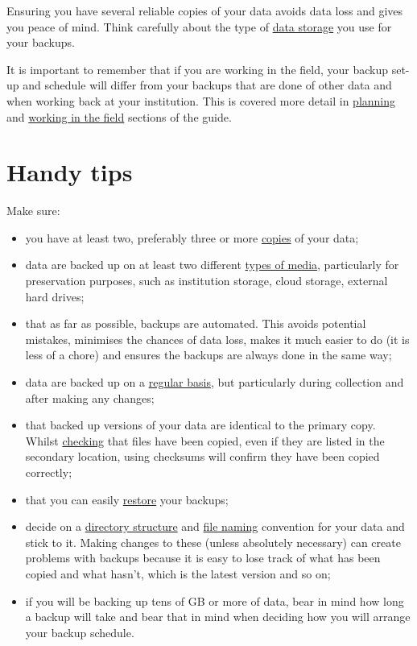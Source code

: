 \documentclass[a4paper,oneside]{report}
\providecommand{\tightlist}{%
  \setlength{\itemsep}{0pt}\setlength{\parskip}{0pt}}
\begin{document}
Ensuring you have several reliable copies of your data avoids data loss
and gives you peace of mind. Think carefully about the type of
\protect\hyperlink{storing-data}{data storage} you use for your backups.

It is important to remember that if you are working in the field, your
backup set-up and schedule will differ from your backups that are done
of other data and when working back at your institution. This is covered
more detail in \protect\hyperlink{before-you-go}{planning} and
\protect\hyperlink{in-the-field}{working in the field} sections of the
guide.

\hypertarget{handy-tips-3}{%
\section{Handy tips}\label{handy-tips-3}}

Make sure:

\begin{itemize}
\tightlist
\item
  you have at least two, preferably three or more
  \protect\hyperlink{how-much-and-how-often}{copies} of your data;
\item
  data are backed up on at least two different
  \protect\hyperlink{storing-data}{types of media}, particularly for
  preservation purposes, such as institution storage, cloud storage,
  external hard drives;
\item
  that as far as possible, backups are automated. This avoids potential
  mistakes, minimises the chances of data loss, makes it much easier to
  do (it is less of a chore) and ensures the backups are always done in
  the same way;
\item
  data are backed up on a
  \protect\hyperlink{how-much-and-how-often}{regular basis}, but
  particularly during collection and after making any changes;
\item
  that backed up versions of your data are identical to the primary
  copy. Whilst
  \protect\hyperlink{checking-and-restoring-backups}{checking} that
  files have been copied, even if they are listed in the secondary
  location, using checksums will confirm they have been copied
  correctly;
\item
  that you can easily
  \protect\hyperlink{checking-and-restoring-backups}{restore} your
  backups;
\item
  decide on a \protect\hyperlink{storing-data}{directory structure} and
  \protect\hyperlink{file-naming}{file naming} convention for your data
  and stick to it. Making changes to these (unless absolutely necessary)
  can create problems with backups because it is easy to lose track of
  what has been copied and what hasn't, which is the latest version and
  so on;
\item
  if you will be backing up tens of GB or more of data, bear in mind how
  long a backup will take and bear that in mind when deciding how you
  will arrange your backup schedule.
\end{itemize}
\end{document}
